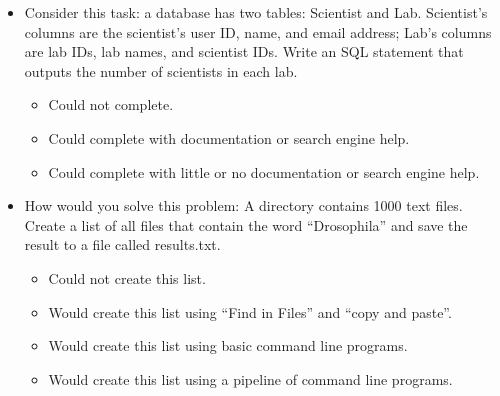 \documentclass[10pt,a4paper,twocolumn]{article}
\begin{document}
\begin{itemize}
  \item
    Consider this task: a database has two tables: Scientist and
    Lab. Scientist's columns are the scientist's user ID, name, and
    email address; Lab's columns are lab IDs, lab names, and scientist
    IDs. Write an SQL statement that outputs the number of scientists
    in each lab.
    \begin{itemize}[noitemsep]
    \item Could not complete.
    \item Could complete with documentation or search engine help.
    \item Could complete with little or no documentation or search engine help.
    \end{itemize}

  \item
    How would you solve this problem: A directory contains 1000 text
    files. Create a list of all files that contain the word
    ``Drosophila'' and save the result to a file called results.txt.
    \begin{itemize}[noitemsep]
    \item Could not create this list.
    \item Would create this list using ``Find in Files'' and ``copy and paste''.
    \item Would create this list using basic command line programs.
    \item Would create this list using a pipeline of command line programs.
    \end{itemize}

  \end{itemize}
\end{document}
